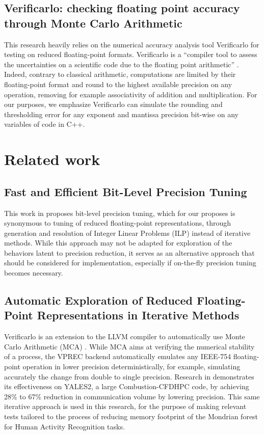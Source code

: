 \documentclass[conference]{IEEEtran}
\begin{document}
\subsection{Verificarlo: checking floating point accuracy through Monte Carlo Arithmetic}
This research heavily relies on the numerical accuracy analysis tool Verificarlo for testing on reduced floating-point formats. Verificarlo is a “compiler tool to assess the uncertainties on a scientific code due to the floating point arithmetic” \cite{denis2016verificarlo}. Indeed, contrary to classical arithmetic, computations are limited by their floating-point format and round to the highest available precision on any operation, removing for example associativity of addition and multiplication. For our purposes, we emphasize Verificarlo can simulate the rounding and thresholding error for any exponent and mantissa precision bit-wise on any variables of code in C++.
\section{Related work}
\subsection{Fast and Efficient Bit-Level Precision Tuning}
This work in \cite{adje2021fast} proposes bit-level precision tuning, which for our proposes is synonymous to tuning of reduced floating-point representations, through generation and resolution of Integer Linear Problems (ILP) instead of iterative methods. While this approach may not be adapted for exploration of the behaviors latent to precision reduction, it serves as an alternative approach that should be considered for implementation, especially if on-the-fly precision tuning becomes necessary.
\subsection{Automatic Exploration of Reduced Floating-Point Representations in Iterative Methods}
Verificarlo is an extension to the LLVM compiler to automatically use Monte Carlo Arithmetic (MCA) \cite{denis2016verificarlo}. While MCA aims at verifying the numerical stability of a process, the VPREC backend automatically emulates any IEEE-754 floating-point operation in lower precision deterministically, for example, simulating accurately the change from double to single precision. Research in \cite{chatelain2019automatic} demonstrates its effectiveness on YALES2, a large Combustion-CFDHPC code, by achieving 28\% to 67\% reduction in communication volume by lowering precision. This same iterative approach is used in this research, for the purpose of making relevant tests tailored to the process of reducing memory footprint of the Mondrian forest for Human Activity Recognition tasks.
\end{document}
